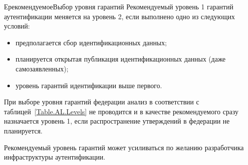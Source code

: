 \begin{appendix}{Е}{рекомендуемое}{Выбор уровня гарантий}
Рекомендуемый уровень 1 гарантий аутентификации меняется на уровень 2,
если выполнено одно из следующих условий:
\begin{itemize}
\item
предполагается сбор идентификационных данных;
\item
планируется открытая публикация идентификационных данных (даже самозаявленных);
\item
уровень гарантий идентификации выше первого.
\end{itemize}

При выборе уровня гарантий федерации анализ в соответствии с 
таблицей~\ref{Table.AL.Levels} не проводится и в качестве рекомендуемого 
сразу назначается уровень 1, если распространение утверждений в федерации не 
планируется.

Рекомендуемый уровень гарантий может усиливаться по желанию 
разработчика инфраструктуры аутентификации.

\end{appendix}
